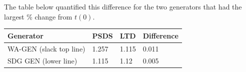 \documentclass[12pt]{article}
\begin{document}
The table below quantified this difference for the two generators that had the largest \% change from $t(0)$.

\begin{table}[!ht]
	\centering
	\begin{tabular}{@{} llll @{}} 	
		\toprule %
		\footnotesize %
		 Generator & PSDS  & LTD  & Difference  \\
		\midrule		
		WA-GEN (slack top line) & 1.257  & 1.115  & 0.011   \\
		SDG GEN (lower line) & 1.115  & 1.12  & 0.005  \\
		\bottomrule
	\end{tabular}
\end{table}
\end{document}
